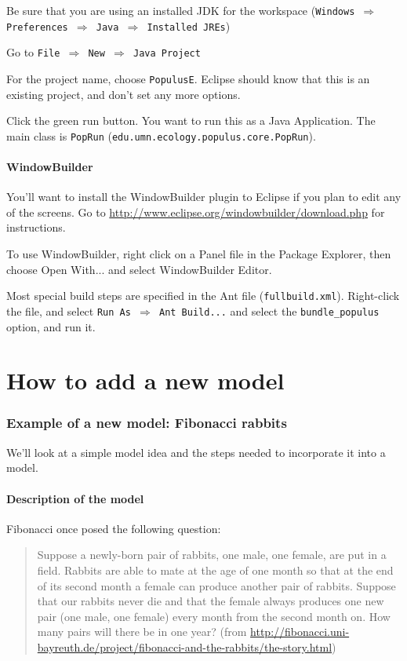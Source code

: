 \documentclass[12pt]{article}
\begin{document}
Be sure that you are using an installed JDK for the workspace (\texttt{Windows $\Rightarrow$ Preferences $\Rightarrow$ Java $\Rightarrow$ Installed JREs})

Go to \texttt{File $\Rightarrow$ New $\Rightarrow$ Java Project}


For the project name, choose \texttt{PopulusE}.  Eclipse should know that this is an existing project, and don't set any more options.

Click the green run button.  You want to run this as a Java Application.  The main class is \texttt{PopRun} (\texttt{edu.umn.ecology.populus.core.PopRun}).

\subsection{WindowBuilder}
You'll want to install the WindowBuilder plugin to Eclipse if you plan to edit any of the screens.  Go to \url{http://www.eclipse.org/windowbuilder/download.php} for instructions.

To use WindowBuilder, right click on a Panel file in the Package Explorer, then choose Open With... and select WindowBuilder Editor.


Most special build steps are specified in the Ant file (\texttt{fullbuild.xml}). Right-click the file, and select \texttt{Run As $\Rightarrow$ Ant Build...} and select the \texttt{bundle\_populus} option, and run it.

\part{How to add a new model}
\section{Example of a new model: Fibonacci rabbits}

We'll look at a simple model idea and the steps needed to incorporate it into a model.

\subsection{Description of the model}
Fibonacci once posed the following question:

\begin{quote}
Suppose a newly-born pair of rabbits, one male, one female, are put in a field. Rabbits are able to mate at the age of one month so that at the end of its second month a female can produce another pair of rabbits. Suppose that our rabbits never die and that the female always produces one new pair (one male, one female) every month from the second month on. How many pairs will there be in one year?  (from \url{http://fibonacci.uni-bayreuth.de/project/fibonacci-and-the-rabbits/the-story.html})
\end{quote}
\end{document}
